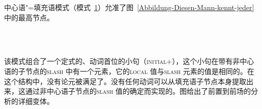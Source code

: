 \noindent
中心语"=填充语模式（模式~\ref{hf-schemaa}）允准了图~\vref{Abbildung-Diesen-Mann-kennt-jeder}中的最高节点。
%
\begin{figure}
\begin{schema}[中心语"=填充语模式]
\label{hf-schemaa}
~\\\samepage
{} \impl\\
\end{schema}
\vspace{-\baselineskip}
\end{figure}%
该模式组合了一个定式的、动词首位的小句（\textsc{initial}+），这个小句在带有非中心语的子节点的\textsc{slash} 中有一个元素，它的\textsc{local} 值与\textsc{slash} 元素的值是相同的。在这个结构中，没有论元被满足了。没有任何动词可以从填充语子节点本身提取出来，这通过非中心语子节点的\textsc{slash} 值的确定而实现的。图给出了前置到前场的分析的详细变体。
